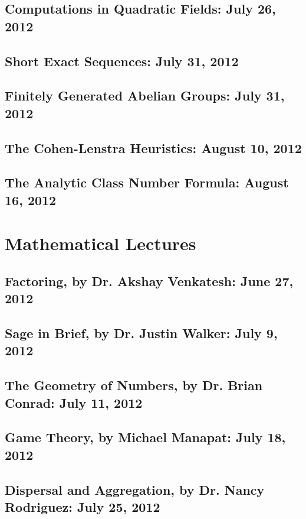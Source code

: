 \documentclass[twosided,openany]{book}
\begin{document}
    \section{Computations in Quadratic Fields: July 26, 2012}
	
    \section{Short Exact Sequences: July 31, 2012}
	
    \section{Finitely Generated Abelian Groups: July 31, 2012}
	
    \section{The Cohen-Lenstra Heuristics: August 10, 2012}
	
    \section{The Analytic Class Number Formula: August 16, 2012}
	
\chapter{Mathematical Lectures}
    \section{Factoring, by Dr. Akshay Venkatesh: June 27, 2012}
	
    \section{{\sc Sage} in Brief, by Dr. Justin Walker: July 9, 2012}
	
    \section{The Geometry of Numbers, by Dr. Brian Conrad: July 11, 2012}
	
    \section{Game Theory, by Michael Manapat: July 18, 2012}
	
    \section{Dispersal and Aggregation, by Dr. Nancy Rodriguez: July 25, 2012}
	
\end{document}
